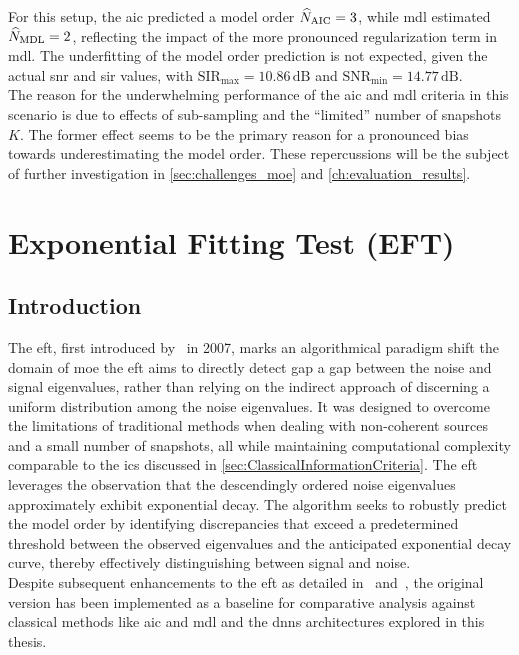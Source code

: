 For this setup, the \gls{aic} predicted a model order \( \widehat{N}_\mathrm{AIC} = 3 \), while \gls{mdl} estimated
\( \widehat{N}_\mathrm{MDL} = 2 \), reflecting the impact of the more pronounced regularization term in \gls{mdl}.
The underfitting of the model order prediction is not expected, given the actual \gls{snr} and \gls{sir} values, with \( \mathrm{SIR}_{\max} = 10.86 \, \text{dB} \)
and \( \mathrm{SNR}_{\min} = 14.77 \, \text{dB} \). \\
The reason for the underwhelming performance of the \gls{aic} and \gls{mdl} criteria in this
scenario is due to effects of sub-sampling and the ``limited'' number of snapshots \( K \).
The former effect seems to be the primary reason for a pronounced bias towards underestimating the model order.
These repercussions will be the subject of further investigation in \autoref{sec:challenges_moe} and \autoref{ch:evaluation_results}.



\section{Exponential Fitting Test (EFT)}
\label{sec:eft}
\subsection{Introduction}
The \glsdesc{eft}, first introduced by~\cite{eft} in 2007, marks an algorithmical paradigm shift the domain of \gls{moe}
the \gls{eft} aims to directly detect gap a gap between the noise and signal eigenvalues, rather than relying on
the indirect approach of discerning a uniform distribution among the noise eigenvalues.
It was designed to overcome the limitations of traditional methods when dealing with non-coherent sources and a small
number of snapshots, all while maintaining computational complexity comparable to the \glspl{ic} discussed in \autoref{sec:ClassicalInformationCriteria}.
The \gls{eft} leverages the observation that the descendingly ordered noise eigenvalues approximately exhibit exponential decay.
The algorithm seeks to robustly predict the model order by identifying discrepancies
that exceed a predetermined threshold between the observed eigenvalues and the
anticipated exponential decay curve, thereby effectively distinguishing between signal and noise. \\

Despite subsequent enhancements to the \gls{eft} as detailed in~\cite{costa2007} and~\cite{costa2009}, the original version
has been implemented as a baseline for comparative analysis against classical methods like \gls{aic} and \gls{mdl} and
the \glspl{dnn} architectures explored in this thesis.\\

